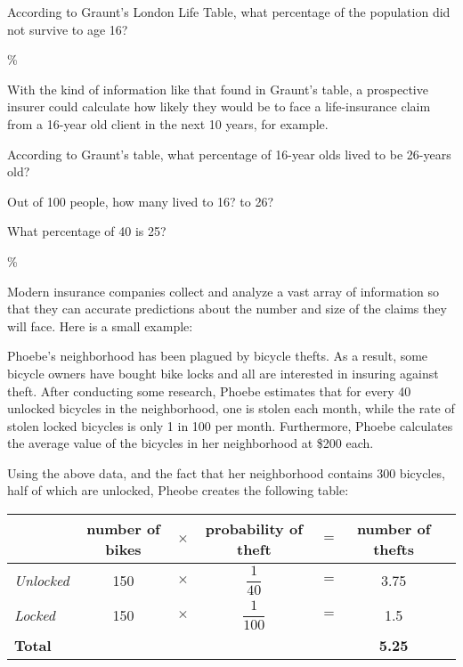 \documentclass{ximera}
\begin{document}
\begin{question}
According to Graunt's London Life Table, what percentage of the population did not survive to age 16?
\begin{solution}
\%
\end{solution}	
\end{question}

With the kind of information like that found in Graunt's table, a prospective insurer could calculate how likely they would be to face a life-insurance claim from a 16-year old client in the next 10 years, for example.

\begin{question}
According to Graunt's table, what percentage of 16-year olds lived to be 26-years old?
\begin{solution}
\begin{hint}
Out of 100 people, how many lived to 16? to 26?
\end{hint}
\begin{hint}
What percentage of 40 is 25? 
\end{hint}
\%
\end{solution}	
\end{question}

Modern insurance companies collect and analyze a vast array of information so that they can accurate predictions about the number and size of the claims they will face. Here is a small example:

Phoebe's neighborhood has been plagued by bicycle thefts. As a result, some bicycle owners have bought bike locks and all are interested in insuring against theft. After conducting some research, Phoebe estimates that for every 40 unlocked bicycles in the neighborhood, one is stolen each month, while the rate of stolen locked bicycles is only 1 in 100 per month. Furthermore, Phoebe calculates the average value of the bicycles in her neighborhood at \$200 each.

Using the above data, and the fact that her neighborhood contains 300 bicycles, half of which are unlocked, Pheobe creates the following table:

\begin{center}
\begin{tabular}{@{}lcccccc@{}}
 & number of bikes & $\times$ & probability of theft & $=$ & number of thefts\\\midrule
\textit{Unlocked} & 150 & $\times$ & $\dfrac{1}{40}$ & $=$  & 3.75\\
\textit{Locked} & 150 & $\times$ & $\dfrac{1}{100}$ & $=$ & 1.5\\\bottomrule
\textbf{Total} & & & & & \textbf{5.25}
\end{tabular}
\end{center}
\end{document}
